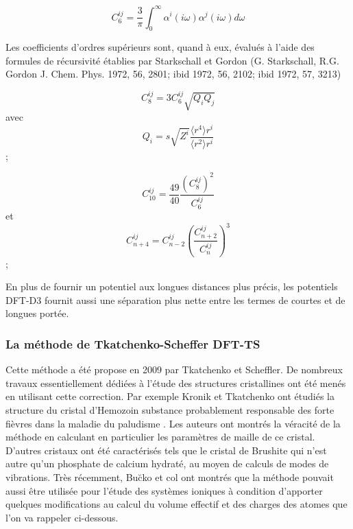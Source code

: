 \bigskip
\begin{equation}
C_{6}^{ij} = \frac{3}{\pi}\int_{0}^{\infty} \alpha^{i} (i\omega) \alpha^{j} (i\omega) d\omega
\end{equation}
\bigskip

Les coefficients d’ordres supérieurs sont, quand à eux, évalués à l’aide des formules de récursivité établies par Starkschall et Gordon (G. Starkschall, R.G. Gordon J. Chem. Phys. 1972, 56, 2801; ibid 1972, 56, 2102; ibid 1972, 57, 3213)

\begin{multicols}{2}
	\begin{equation}{C}_{8}^{ij} = 3{C}_{6}^{ij}\sqrt {{Q}_{i}{Q}_{j}}\end{equation} avec
	\begin{equation}Q_{i} = s\sqrt{Z^{i}} \frac{\langle r^{4}\rangle r^{i}}{\langle r^{2}\rangle r^{i}}\end{equation}; 
\end{multicols}

\begin{multicols}{2}
	\begin{equation} {C}_{10}^{ij}=\frac {49}{40} \frac{{\left({C}_{8}^{ij} \right)}^{2}}{{C}_{6}^{ij}} \end{equation} et
	\begin{equation} {C}_{n+4}^{ij}={C}_{n-2}^{ij}{\left(\frac{ {C}_{n+2}^{ij} }{ {C}_{n}^{ij} }\right)}^{3} \end{equation}; 
\end{multicols}

En plus de fournir un potentiel aux longues distances plus précis, les potentiels DFT-D3 fournit aussi une séparation plus nette entre les termes de courtes et de longues portée. 


\subsubsection{La méthode de Tkatchenko-Scheffer DFT-TS}

Cette méthode a été propose en 2009 par Tkatchenko et Scheffler\cite{tkatchenko2009accurate}. De nombreux travaux essentiellement dédiées à l’étude des structures cristallines ont été menés en utilisant cette correction. Par exemple Kronik et Tkatchenko\cite{kronik2014understanding} ont étudiés la structure du cristal d'Hemozoin substance probablement responsable des forte fièvres dans la maladie du paludisme . Les auteurs ont montrés la véracité de la méthode en calculant en particulier les paramètres de maille de ce cristal.  D’autres cristaux ont été caractérisés tels que le cristal de Brushite qui n’est autre qu’un phosphate de calcium hydraté, au moyen de calculs de modes de vibrations. Très récemment, Bu\u{c}ko et col\cite{buvcko2014extending} ont montrés que la méthode pouvait aussi être utilisée pour l’étude des systèmes ioniques à condition d’apporter quelques modifications au calcul du volume effectif et des charges des atomes que l’on va rappeler ci-dessous.

